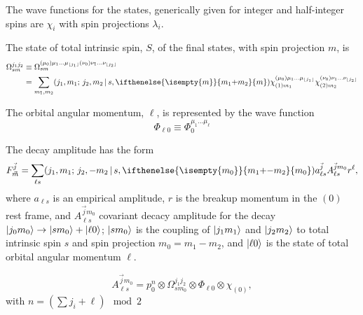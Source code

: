 \documentclass[a4paper]{article}
\newcommand{\decay}[2]{\ensuremath{#1 \to #2}}
\newcommand{\cg}[6]{(#1, #2;\, #3, #4\, |\, #5, \ifthenelse{\isempty{#6}}{#2{+}#4}{#6})}
\begin{document}
The wave functions for the states, generically given for integer and
half-integer spins are $\chi_{i}$ with spin projections $\lambda_{i}$.

The state of total intrinsic spin, $S$, of the final states, with spin
projection $m$, is
\begin{align}
  \Omega^{j_1j_2}_{sm} &\equiv \Omega_{sm}^{(\mu_0)\mu_1\dots\mu_{\lfloor j_1\rfloor}(\nu_0)\nu_1\dots\nu_{\lfloor j_2\rfloor}}\\
    & = \sum_{m_1, m_2} \cg{j_1}{m_1}{j_2}{m_2}{s}{m}
    \chi_{(1)m_1}^{(\mu_0)\mu_1\dots\mu_{\lfloor j_1\rfloor}}
    \chi_{(2)m_2}^{(\nu_0)\nu_1\dots\nu_{\lfloor j_2\rfloor}}
\end{align}

The orbital angular momentum, $\ell$, is represented by the wave
function
\begin{equation}
  \Phi_{\ell0} \equiv \Phi^{\mu_1\dots\mu_\ell}_0
\end{equation}

The decay amplitude has the form
\begin{equation}
  F^{\vec j}_{\vec m} = \sum_{\ell s} \cg{j_1}{m_1}{j_2}{{-}m_2}{s}{m_0} a^{\vec j}_{\ell s} A^{\vec j m_0}_{\ell s} r^\ell,
\end{equation}
where $a_{\ell s}$ is an empirical amplitude, $r$ is the breakup
momentum in the $(0)$ rest frame, and $A^{\vec j m_0}_{\ell s}$
covariant decacy amplitude for the decay
\decay{\ket{j_0m_0}}{\ket{sm_0} + \ket{\ell0}}; $\ket{sm_0}$ is the
coupling of $\ket{j_1m_1}$ and $\ket{j_2m_2}$ to total intrinsic spin
$s$ and spin projection $m_0 = m_1 - m_2$, and $\ket{\ell0}$ is the
state of total orbital angular momentum $\ell$.

\begin{equation}
  A^{\vec j m_0}_{\ell s} = p_0^n \otimes \Omega^{j_1j_2}_{sm_0} \otimes \Phi_{\ell 0} \otimes \chi_{(0)},
\end{equation}
with $n = (\sum j_i + \ell) \mod 2$



\end{document}
